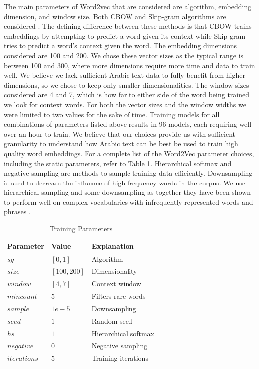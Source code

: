 The main parameters of Word2vec that are considered are algorithm, embedding dimension, and window size. Both CBOW and Skip-gram algorithms are considered \cite{mikoloveffic:2013}. The defining difference between these methods is that CBOW trains embeddings by attempting to predict a word given its context while Skip-gram tries to predict a word's context given the word. The embedding dimensions considered are 100 and 200. We chose these vector sizes as the typical range is between 100 and 300, where more dimensions require more time and data to train well. We believe we lack sufficient Arabic text data to fully benefit from higher dimensions, so we chose to keep only smaller dimensionalities. The window sizes considered are 4 and 7, which is how far to either side of the word being trained we look for context words. For both the vector sizes and the window widths we were limited to two values for the sake of time. Training models for all combinations of parameters listed above results in 96 models, each requiring well over an hour to train. We believe that our choices provide us with sufficient granularity to understand how Arabic text can be best be used to train high quality word embeddings. For a complete list of the Word2Vec parameter choices, including the static parameters, refer to Table \ref{table:params}. Hierarchical softmax and negative sampling are methods to sample training data efficiently. Downsampling is used to decrease the influence of high frequency words in the corpus. We use hierarchical sampling and some downsampling as together they have been shown to perform well on complex vocabularies with infrequently represented words and phrases \cite{mikolovdist:2013}.

\begin{table}
\begin{center}
\begin{tabular}{l|l|l}
\textbf{Parameter} & \textbf{Value} & \textbf{Explanation} \\
\hline
$sg$ & $[0,1]$ & Algorithm \\
$size$ & $[100, 200]$ & Dimensionality \\
$window$ & $[4, 7]$ & Context window \\
$min count$ & $5$ & Filters rare words \\
$sample$ & $1e-5$ & Downsampling \\
$seed$ & $1$ & Random seed \\
$hs$ & $1$ & Hierarchical softmax \\
$negative$ & $0$ & Negative sampling \\
$iterations$ & $5$ & Training iterations \\
\end{tabular}
\caption{Training Parameters}
\label{table:params}
\end{center}
\end{table}

